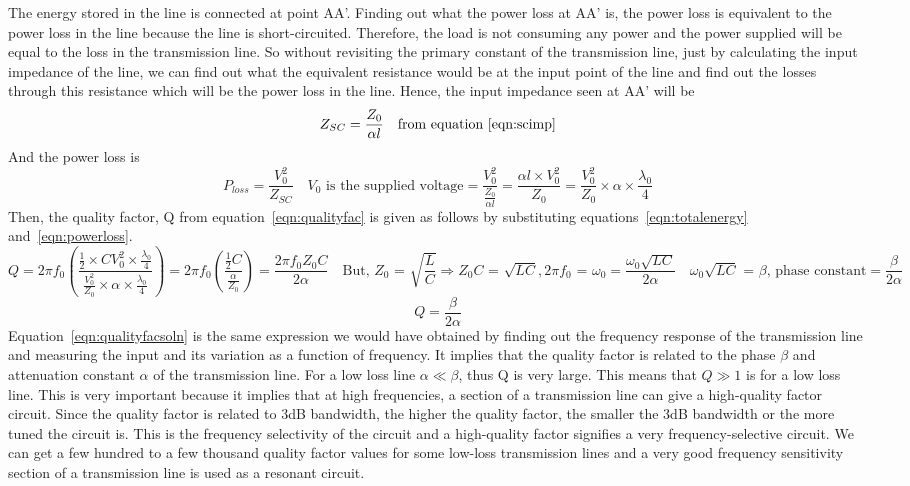 The energy stored in the line is connected at point AA'. Finding out what the power loss at AA' is, the power loss is equivalent to the power loss in the line because the line is short-circuited. Therefore, the load is not consuming any power and the power supplied will be equal to the loss in the transmission line. So without revisiting the primary constant of the transmission line, just by calculating the input impedance of the line, we can find out what the equivalent resistance would be at the input point of the line and find out the losses through this resistance which will be the power loss in the line. Hence, the input impedance seen at AA' will be
\begin{equation*}
Z_{SC} = \frac{Z_0}{\alpha l}\quad\text{from equation~\eqref{eqn:scimp}}
\end{equation*}
And the power loss is
\begin{dmath}
P_{loss} = \frac{V_0^{2}}{Z_{SC}}\quad V_0\text{ is the supplied voltage}
= \frac{V_0^{2}}{\frac{Z_0}{\alpha l}}
= \frac{\alpha l\times V_0^2}{Z_0}
= \frac{V_0^{2}}{Z_0}\times\alpha \times\frac{\lambda_{0}}{4}
\label{eqn:powerloss}
\end{dmath}
Then, the quality factor, Q from equation~\eqref{eqn:qualityfac} is given as follows by substituting equations~\eqref{eqn:totalenergy} and~\eqref{eqn:powerloss}.
\begin{dmath*}
Q = 2 \pi f_0\left(\frac{\frac{1}{2}\times CV_0^{2}\times\frac{\lambda_{0}}{4}}{\frac{V_0^{2}}{Z_0}\times\alpha \times\frac{\lambda_{0}}{4}}\right)
= 2 \pi f_0\left(\frac{\frac{1}{2}C}{\frac{\alpha}{Z_0}}\right)
= \frac{2 \pi f_0 Z_0C}{2\alpha}\quad\text{But, }Z_0\text{ = }\sqrt{\frac{L}{C}}\Rightarrow Z_0C\text{ = }\sqrt{LC}, 2\pi f_0\text{ = }\omega_{0}
= \frac{\omega_{0}\sqrt{LC}}{2 \alpha}\quad\omega_{0}\sqrt{LC}\text{ = }\beta\text{, phase constant}
= \frac{\beta}{2 \alpha}
\end{dmath*}
\begin{equation}
Q = \frac{\beta}{2 \alpha}
\label{eqn:qualityfacsoln}
\end{equation}
Equation~\eqref{eqn:qualityfacsoln} is the same expression we would have obtained by finding out the frequency response of the transmission line and measuring the input and its variation as a function of frequency. It implies that the quality factor is related to the phase $\beta$ and attenuation constant $ \alpha$ of the transmission line. For a low loss line $ \alpha \ll \beta$, thus Q is very large. This means that $Q \gg 1$ is for a low loss line. This is very important because it implies that at high frequencies, a section of a transmission line can give a high-quality factor circuit. Since the quality factor is related to 3dB bandwidth, the higher the quality factor, the smaller the 3dB bandwidth or the more tuned the circuit is. This is the frequency selectivity of the circuit and a high-quality factor signifies a very frequency-selective circuit. We can get a few hundred to a few thousand quality factor values for some low-loss transmission lines and a very good frequency sensitivity section of a transmission line is used as a resonant circuit.

